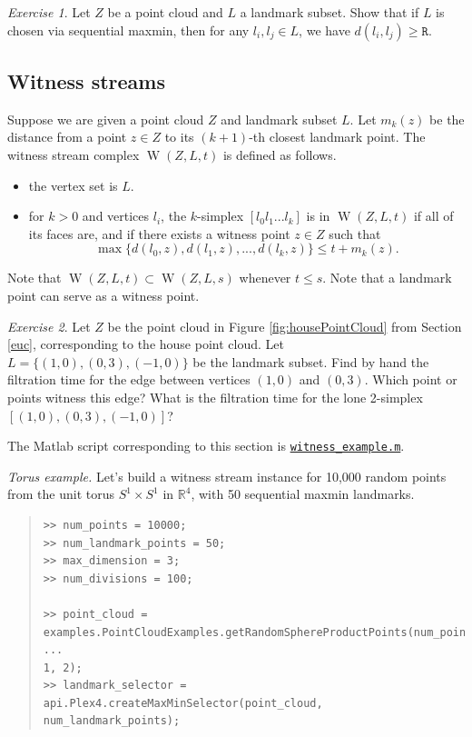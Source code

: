 \documentclass[amscd, amssymb, verbatim]{amsart}[12pt]
\theoremstyle{remark}
\newtheorem{exercise}{Exercise}
\theoremstyle{remark}
\theoremstyle{remark}
\DeclareMathOperator{\W}{W}
\begin{document}
\begin{exercise}
Let $Z$ be a point cloud and $L$ a landmark subset. Show that if $L$ is chosen via sequential maxmin, then for any $l_i,l_j\in L$, we have $d(l_i,l_j)\geq\texttt{R}$. 
\end{exercise}


\subsection{Witness streams}
Suppose we are given a point cloud $Z$ and landmark subset $L$. Let $m_k(z)$ be the distance from a point $z \in Z$ to its $(k+1)$-th closest landmark point. The witness stream complex $\W(Z,L,t)$ is defined as follows.
\begin{itemize}
\item{the vertex set is $L$.}
\item{for $k>0$ and vertices $l_i$, the $k$-simplex $[l_0 l_1 ... l_k]$ is in $\W(Z,L,t)$ if all of its faces are, and if there exists a witness point $z \in Z$ such that $$\max\bigl\{d(l_0,z), d(l_1,z), ..., d(l_k,z)\bigr\} \leq t+m_k(z).$$ }
\end{itemize}
Note that $\W(Z,L,t) \subset \W(Z,L,s)$ whenever $t\leq s$. Note that a landmark point can serve as a witness point. 

\begin{exercise}\label{Ex:witnessHouse}
Let $Z$ be the point cloud in Figure \ref{fig:housePointCloud} from Section \ref{euc}, corresponding to the house point cloud. Let $L = \{(1,0),(0,3),(-1,0)\}$ be the landmark subset. Find by hand the filtration time for the edge between vertices $(1,0)$ and $(0,3)$. Which point or points witness this edge? What is the filtration time for the lone 2-simplex $[(1,0),(0,3),(-1,0)]$? 
\end{exercise}

The Matlab script corresponding to this section is \href{https://github.com/appliedtopology/javaplex/tree/master/src/matlab/for_distribution/tutorial_examples/witness_example.m}{\texttt{witness\_example.m}}.

{\em Torus example.} Let's build a witness stream instance for 10,000 random points from the unit torus $S^1 \times S^1$ in $\mathbb{R}^4$, with 50 sequential maxmin landmarks.

\begin{quote} \begin{verbatim}
>> num_points = 10000;
>> num_landmark_points = 50;
>> max_dimension = 3;
>> num_divisions = 100;

>> point_cloud = examples.PointCloudExamples.getRandomSphereProductPoints(num_points, ...
1, 2);
>> landmark_selector = api.Plex4.createMaxMinSelector(point_cloud, num_landmark_points);
\end{verbatim} \end{quote}
\end{document}
